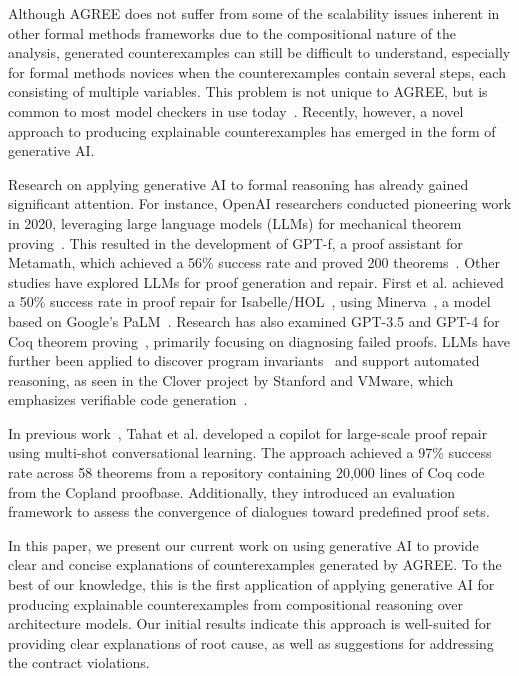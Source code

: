 Although AGREE does not suffer from some of the scalability issues inherent in other formal methods frameworks due to the compositional nature of the analysis, generated counterexamples can still be difficult to understand, especially for formal methods novices when the counterexamples contain several steps, each consisting of multiple variables.  This problem is not unique to AGREE, but is common to most model checkers in use today~\cite{cex-explanation}.  
Recently, however, a novel approach to producing explainable counterexamples has emerged in the form of generative AI.

Research on applying generative AI to formal reasoning has already gained significant attention. For instance, OpenAI researchers conducted pioneering work in 2020, leveraging large language models (LLMs) for mechanical theorem proving~\cite{polu2020generative}. This resulted in the development of GPT-f, a proof assistant for Metamath, which achieved a 56\% success rate and proved 200 theorems~\cite{megill2019metamath}. Other studies have explored LLMs for proof generation and repair. First et al. achieved a 50\% success rate in proof repair for Isabelle/HOL~\cite{first2023baldur}, using Minerva~\cite{lewkowycz2022solving}, a model based on Google’s PaLM~\cite{chowdhery2022palm}. Research has also examined GPT-3.5 and GPT-4 for Coq theorem proving~\cite{zhang2023getting}, primarily focusing on diagnosing failed proofs. LLMs have further been applied to discover program invariants~\cite{pei2023can, wu2023lemur} and support automated reasoning, as seen in the Clover project by Stanford and VMware, which emphasizes verifiable code generation~\cite{sun2024clover}.

In previous work~\cite{CoqDog, CoqDogHCSS24}, Tahat et al. developed a copilot for large-scale proof repair using multi-shot conversational learning. The approach achieved a 97\% success rate across 58 theorems from a repository containing 20,000 lines of Coq code from the Copland proofbase. Additionally, they introduced an evaluation framework to assess the convergence of dialogues toward predefined proof sets.
%

In this paper, we present our current work on using generative AI to provide clear and concise explanations of counterexamples generated by AGREE.  
%
To the best of our knowledge, this is the first application of applying generative AI for producing explainable counterexamples from compositional reasoning over architecture models.
%
Our initial results indicate this approach is well-suited for providing clear explanations of root cause, as well as suggestions for addressing the contract violations.